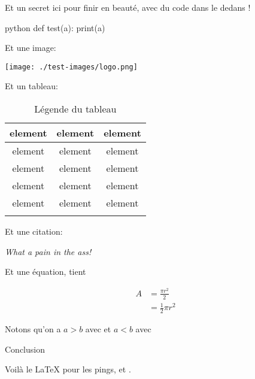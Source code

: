 \documentclass[small]{zmdocument}
\begin{document}
\begin{Spoiler}
Et un secret ici pour finir en beauté, avec du code dans le dedans !

\begin{CodeBlock}[][1]{python}
def test(a):
    print(a)
\end{CodeBlock}

Et une image:

\begin{center}
\texttt{[image: ./test-images/logo.png]}
\end{center}

Et un tableau:

\begin{longtabu}{|c|c|c|} \hline
element & element & element\\ \hline
element & element & element\\ \hline
element & element & element\\ \hline
element & element & element\\ \hline
element & element & element\\ \hline
\caption{Légende du tableau}
\end{longtabu}

Et une citation:

\begin{Quotation}[me]
\textit{What a pain in the ass!}
\end{Quotation}

Et une équation, tient

\[
\begin{split}
A & = \frac{\pi r^2}{2} \\
 & = \frac{1}{2} \pi r^2
\end{split}
\]

Notons qu'on a $a \gt b$ avec  et $a \lt b$ avec 
\end{Spoiler}

Conclusion


Voilà le LaTeX pour les pings,  et .
\end{document}
